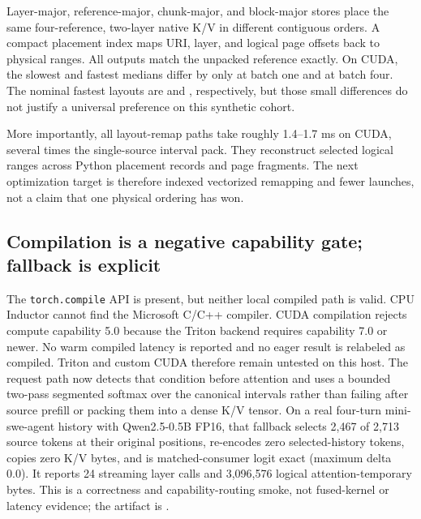 \documentclass[11pt]{article}
\begin{document}
Layer-major, reference-major, chunk-major, and block-major stores place the same
four-reference, two-layer native K/V in different contiguous orders.  A compact
placement index maps URI, layer, and logical page offsets back to physical
ranges.  All outputs match the unpacked reference exactly.  On CUDA, the
slowest and fastest medians differ by only \RuntimeLayoutSpreadBatchOne{} at
batch one and \RuntimeLayoutSpreadBatchFour{} at batch four.  The nominal
fastest layouts are \RuntimeLayoutFastestBatchOne{} and
\RuntimeLayoutFastestBatchFour{}, respectively, but those small differences do
not justify a universal preference on this synthetic cohort.

More importantly, all layout-remap paths take roughly 1.4--1.7 ms on CUDA,
several times the single-source interval pack.  They reconstruct selected
logical ranges across Python placement records and page fragments.  The next
optimization target is therefore indexed vectorized remapping and fewer
launches, not a claim that one physical ordering has won.

\subsection{Compilation is a negative capability gate; fallback is explicit}

The \texttt{torch.compile} API is present, but neither local compiled path is
valid.  CPU Inductor cannot find the Microsoft C/C++ compiler.  CUDA compilation
rejects compute capability 5.0 because the Triton backend requires capability
7.0 or newer.  No warm compiled latency is reported and no eager result is
relabeled as compiled.  Triton and custom CUDA therefore remain untested on
this host.  The request path now detects that condition before attention and
uses a bounded two-pass segmented softmax over the canonical intervals rather
than failing after source prefill or packing them into a dense K/V tensor.
On a real four-turn mini-swe-agent history with Qwen2.5-0.5B FP16, that fallback
selects 2,467 of 2,713 source tokens at their original positions, re-encodes
zero selected-history tokens, copies zero K/V bytes, and is matched-consumer
logit exact (maximum delta 0.0).  It reports 24 streaming layer calls and
3,096,576 logical attention-temporary bytes.  This is a correctness and
capability-routing smoke, not fused-kernel or latency evidence; the artifact is
.
\end{document}
